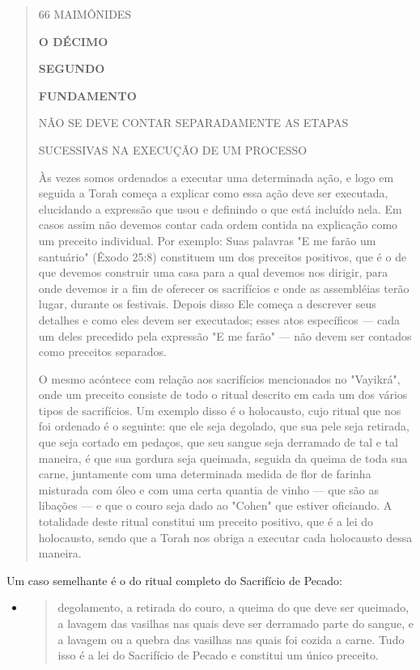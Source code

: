 \begin{quote}
66 MAIMÔNIDES

\textbf{O DÉCIMO}

\textbf{SEGUNDO}

\textbf{FUNDAMENTO}

NÃO SE DEVE CONTAR SEPARADAMENTE AS ETAPAS

SUCESSIVAS NA EXECUÇÃO DE UM PROCESSO

Às vezes somos ordenados a executar uma determinada ação, e lo­go em
seguida a Torah começa a explicar como essa ação deve ser executada,
elucidando a expressão que usou e definindo o que está incluído nela. Em
casos assim não devemos contar cada ordem contida na explicação como um
preceito individual. Por exemplo: Suas palavras "E me farão um
santuário" (Êxodo 25:8) constituem um dos preceitos positivos, que é o
de que devemos construir uma casa para a qual devemos nos dirigir, para
onde devemos ir a fim de oferecer os sacrifícios e onde as assembléias
terão lugar, durante os festivais. Depois disso Ele começa a descrever
seus detalhes e como eles devem ser executados; esses atos específicos
--- cada um deles precedido pela expressão "E me farão" --- não devem
ser contados como preceitos separados.

O mesmo acóntece com relação aos sacrifícios mencionados no "Va­yikrá",
onde um preceito consiste de todo o ritual descrito em cada um dos
vários tipos de sacrifícios. Um exemplo disso é o holocausto, cujo
ritual que nos foi ordenado é o seguinte: que ele seja degolado, que sua
pele seja retirada, que seja cortado em pedaços, que seu sangue seja
derramado de tal e tal manei­ra, é que sua gordura seja queimada,
seguida da queima de toda sua carne, jun­tamente com uma determinada
medida de flor de farinha misturada com óleo e com uma certa quantia de
vinho --- que são as libações --- e que o couro seja dado ao "Cohen" que
estiver oficiando. A totalidade deste ritual constitui um preceito
positivo, que é a lei do holocausto, sendo que a Torah nos obriga a
executar cada holocausto dessa maneira.
\end{quote}

Um caso semelhante é o do ritual completo do Sacrifício de Pecado:

\begin{itemize}
\item
  \begin{quote}
  degolamento, a retirada do couro, a queima do que deve ser queimado, a
  lavagem das vasilhas nas quais deve ser derramado parte do sangue, e a
  lava­gem ou a quebra das vasilhas nas quais foi cozida a carne. Tudo
  isso é a lei do Sacrifício de Pecado e constitui um único preceito.
  \end{quote}
\end{itemize}

